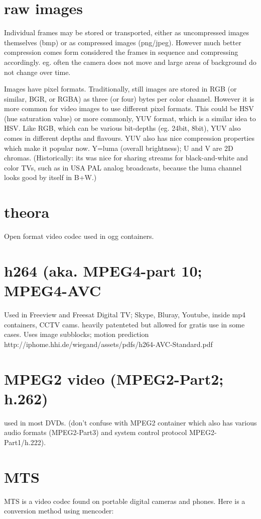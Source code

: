 \documentclass[oneside,english]{scrbook}
\begin{document}
\section{raw images}
Individual frames may be stored or transported, either as uncompressed images themselves (bmp) or as compressed images (png/jpeg). However much better compression comes form considered the frames in sequence and compressing accordingly. eg. often the camera does not move and large areas of background do not change over time.

Images have pixel formats. Traditionally, still images are stored in RGB (or similar, BGR, or RGBA) as three (or four) bytes per color channel.  However it is more common for video images to use different pixel formats.  This could be HSV (hue saturation value) or more commonly, YUV format, which is a similar idea to HSV.  Like RGB, which can be various bit-depths (eg. 24bit, 8bit), YUV also comes in different depths and flavours. YUV also has nice compression properties which make it popular now.  Y=luma (overall brightness); U and V are 2D chromas. (Historically: its was nice for sharing streams for black-and-white and color TVs, such as in USA PAL analog broadcasts, because the luma channel looks good by itself in B+W.)

\section{theora}
Open format video codec used in ogg containers.

\section{h264 (aka. MPEG4-part 10; MPEG4-AVC}
Used in Freeview and Freesat Digital TV; Skype, Bluray, Youtube, inside mp4 containers, CCTV cams.
heavily patenteted but allowed for gratis use in some cases.
Uses image subblocks;  motion prediction
http://iphome.hhi.de/wiegand/assets/pdfs/h264-AVC-Standard.pdf

\section{MPEG2 video (MPEG2-Part2; h.262)}
used in most DVDs.    (don't confuse with MPEG2 container which also has various audio formats (MPEG2-Part3) and system control protocol MPEG2-Part1/h.222).

\section{MTS}
MTS is a video codec found on portable digital cameras and phones.
Here is a conversion method using mencoder:
\end{document}
